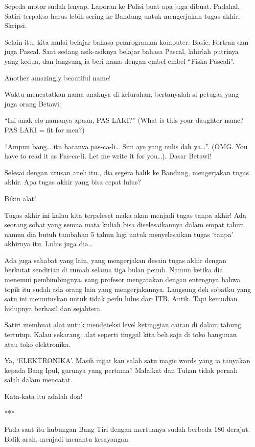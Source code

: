 Sepeda motor sudah lenyap. Laporan ke Polisi buat apa juga dibuat. Padahal, Satiri terpaksa harus lebih sering ke Bandung untuk mengerjakan tugas akhir. Skripsi.

Selain itu, kita mulai belajar bahasa pemrograman komputer: Basic, Fortran dan juga Pascal. Saat sedang asik-asiknya belajar bahasa Pascal, lahirlah putrinya yang kedua, dan langsung ia beri nama dengan embel-embel “Fiska Pascali”.

Another amazingly beautiful name!

Waktu mencatatkan nama anaknya di kelurahan, bertanyalah si petugas yang juga orang Betawi:

“Ini anak elo namanya apaan, PAS LAKI?” (What is this your daughter name? PAS LAKI = fit for men?)

“Ampun bang… itu bacanya pas-ca-li… Sini aye yang nulis dah ya…”. (OMG. You have to read it as Pas-ca-li. Let me write it for you…). Dasar Betawi!

Selesai dengan urusan aneh itu., dia segera balik ke Bandung, mengerjakan tugas akhir. Apa tugas akhir yang bisa cepat lulus?

Bikin alat!

Tugas akhir ini kalau kita terpeleset maka akan menjadi tugas tanpa akhir! Ada seorang sobat yang semua mata kuliah bisa diselesaikannya dalam empat tahun, namun dia butuh tambahan 5 tahun lagi untuk menyelesaikan tugas ‘tanpa’ akhirnya itu. Lulus juga dia…

Ada juga sahabat yang lain, yang mengerjakan desain tugas akhir dengan berkutat sendirian di rumah selama tiga bulan penuh. Namun ketika dia menemui pembimbingnya, sang profesor mengatakan dengan entengnya bahwa topik itu sudah ada orang lain yang mengerjakannya. Langsung deh sobatku yang satu ini memutuskan untuk tidak perlu lulus dari ITB. Antik. Tapi kemudian hidupnya berhasil dan sejahtera.

Satiri membuat alat untuk mendeteksi level ketinggian cairan di dalam tabung tertutup. Kalau sekarang, alat seperti tinggal kita beli saja di toko bangunan atau toko elektronika.

Ya, ‘ELEKTRONIKA’. Masih ingat kan salah satu magic words yang ia tanyakan kepada Bang Ipul, gurunya yang pertama? Malaikat dan Tuhan tidak pernah salah dalam mencatat.

Kata-kata itu adalah doa!

***

Pada saat itu hubungan Bang Tiri dengan mertuanya sudah berbeda 180 derajat. Balik arah, menjadi menantu kesayangan.

